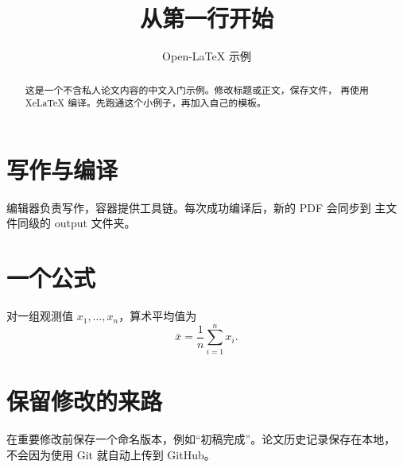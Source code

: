 \documentclass[UTF8,a4paper,11pt]{ctexart}
\title{从第一行开始}
\author{Open-LaTeX 示例}
\date{}
\begin{document}
\maketitle
\begin{abstract}
这是一个不含私人论文内容的中文入门示例。修改标题或正文，保存文件，
再使用 XeLaTeX 编译。先跑通这个小例子，再加入自己的模板。
\end{abstract}
\section{写作与编译}
编辑器负责写作，容器提供工具链。每次成功编译后，新的 PDF 会同步到
主文件同级的 output 文件夹。
\section{一个公式}
对一组观测值 $x_1,\ldots,x_n$，算术平均值为
\begin{equation}
  \bar{x} = \frac{1}{n}\sum_{i=1}^{n}x_i.
\end{equation}
\section{保留修改的来路}
在重要修改前保存一个命名版本，例如“初稿完成”。论文历史记录保存在本地，
不会因为使用 Git 就自动上传到 GitHub。
\end{document}

